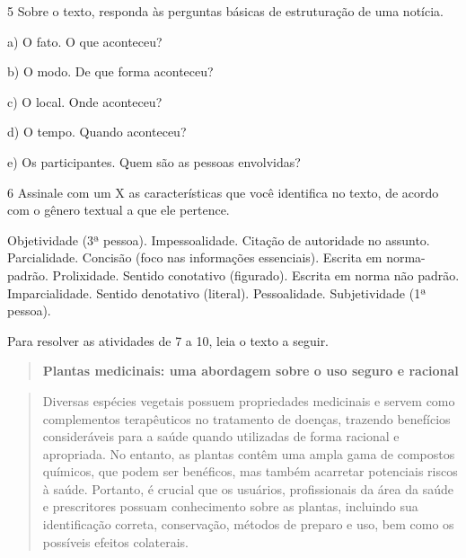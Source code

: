 \num{5} Sobre o texto, responda às perguntas básicas de estruturação de
uma notícia.

a) O fato. O que aconteceu? 


b) O modo. De que forma aconteceu? 


c) O local. Onde aconteceu? 


d) O tempo. Quando aconteceu? 


e) Os participantes. Quem são as pessoas envolvidas? 


\num{6} Assinale com um X as características que você identifica no
texto, de acordo com o gênero textual a que ele pertence.

\begin{boxlist}
 Objetividade (3ª pessoa). 
 Impessoalidade.
 Citação de autoridade no assunto. 
 Parcialidade. 
 Concisão (foco nas informações essenciais). 
 Escrita em norma-padrão. 
 Prolixidade.
 Sentido conotativo (figurado).
 Escrita em norma não padrão. 
Imparcialidade.
 Sentido denotativo (literal).
 Pessoalidade.
 Subjetividade (1ª pessoa).
\end{boxlist}

Para resolver as atividades de 7 a 10, leia o texto a seguir.

\begin{quote}
\textbf{Plantas medicinais: uma abordagem sobre o uso seguro e racional}
\end{quote}

\begin{quote}
Diversas espécies vegetais possuem propriedades medicinais e servem como
complementos terapêuticos no tratamento de doenças, trazendo benefícios
consideráveis para a saúde quando utilizadas de forma racional e
apropriada. No entanto, as plantas contêm uma ampla gama de compostos
químicos, que podem ser benéficos, mas também acarretar potenciais
riscos à saúde. Portanto, é crucial que os usuários, profissionais da
área da saúde e prescritores possuam conhecimento sobre as plantas,
incluindo sua identificação correta, conservação, métodos de preparo e
uso, bem como os possíveis efeitos colaterais.
\end{quote}

